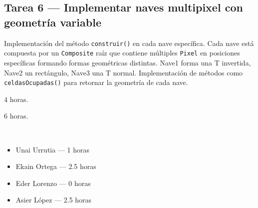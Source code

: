 \documentclass[12pt, a4paper]{article}
\begin{document}
\vspace{0.8em}

\subsection*{Tarea 6 — Implementar naves multipixel con geometría variable}
\begin{description}[leftmargin=2em, style=nextline]
    \item[\textbf{Descripción:}] Implementación del método \texttt{construir()} en cada nave específica. Cada nave está compuesta por un \texttt{Composite} raíz que contiene múltiples \texttt{Pixel} en posiciones específicas formando formas geométricas distintas. Nave1 forma una T invertida, Nave2 un rectángulo, Nave3 una T normal. Implementación de métodos como \texttt{celdasOcupadas()} para retornar la geometría de cada nave.
    \item[\textbf{Tiempo estimado:}] 4 horas.
    \item[\textbf{Tiempo real:}] 6 horas.
    \item[\textbf{Responsables y dedicación:}]~
        \begin{itemize}[leftmargin=1em, nosep]
            \item Unai Urrutia — 1 horas
            \item Ekain Ortega — 2.5 horas
            \item Eder Lorenzo — 0 horas
            \item Asier López — 2.5 horas
        \end{itemize}
\end{description}

\vspace{0.8em}

\end{document}
